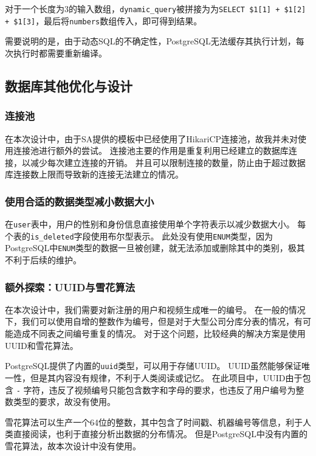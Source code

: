 \documentclass[a4paper,10pt]{ctexart}
\begin{document}
对于一个长度为3的输入数组，\texttt{dynamic\_query}被拼接为为\texttt{SELECT \$1[1] + \$1[2] + \$1[3]}，最后将\texttt{numbers}数组传入，即可得到结果。

需要说明的是，由于动态SQL的不确定性，PostgreSQL无法缓存其执行计划，每次执行时都需要重新编译。

\subsection{数据库其他优化与设计}

\subsubsection{连接池}

在本次设计中，由于SA提供的模板中已经使用了HikariCP连接池，故我并未对使用连接池进行额外的尝试。
连接池主要的作用是重复利用已经建立的数据库连接，以减少每次建立连接的开销。
并且可以限制连接的数量，防止由于超过数据库连接数上限而导致新的连接无法建立的情况。

\subsubsection{使用合适的数据类型减小数据大小}

在\texttt{user}表中，用户的性别和身份信息直接使用单个字符表示以减少数据大小。
每个表的\texttt{is\_deleted}字段使用布尔型表示。
此处没有使用\texttt{ENUM}类型，因为PostgreSQL中\texttt{ENUM}类型的数据一旦被创建，就无法添加或删除其中的类别，极其不利于后续的维护。

\subsubsection{额外探索：UUID与雪花算法}

在本次设计中，我们需要对新注册的用户和视频生成唯一的编号。
在一般的情况下，我们可以使用自增的整数作为编号，但是对于大型公司分库分表的情况，有可能造成不同表之间编号重复的情况。
对于这个问题，比较经典的解决方案是使用UUID和雪花算法。

PostgreSQL提供了内置的\texttt{uuid}类型，可以用于存储UUID。
UUID虽然能够保证唯一性，但是其内容没有规律，不利于人类阅读或记忆。
在此项目中，UUID由于包含 \texttt{-} 字符，违反了视频编号只能包含数字和字母的要求，也违反了用户编号为整数类型的要求，故没有使用。

雪花算法可以生产一个64位的整数，其中包含了时间戳、机器编号等信息，利于人类直接阅读，也利于直接分析出数据的分布情况。
但是PostgreSQL中没有内置的雪花算法，故本次设计中没有使用。
\end{document}
